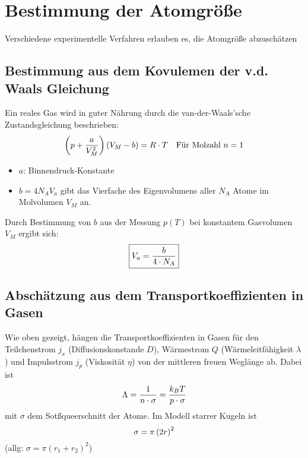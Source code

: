 \section{Bestimmung der Atomgröße} %
\label{sec:Bestimmung_der_Atomgroesse}
Verschiedene experimentelle Verfahren erlauben es, die Atomgröße abzuschätzen

\subsection{Bestimmung aus dem Kovulemen der v.d. Waals Gleichung} %
\label{sub:Bestimmung_aus_dem_Kovulemen_der_v.d._Waals_Gleichung}
Ein reales Gas wird in guter Nährung durch die van-der-Waals'sche
Zustandsgleichung beschrieben:
\begin{equation*}
    \left( p + \frac{a}{V_M^2}\right) \left( V_M -b \right) = R \cdot T \quad \text{Für Molzahl
    $n=1$}
\end{equation*}
\begin{itemize}
    \item $a$: Binnendruck-Konstante
    \item $b=4 N_A V_a$ gibt das Vierfache des Eigenvolumens aller $N_A$ Atome
    im Molvolumen $V_M$ an.
\end{itemize}
Durch Bestimmung von $b$ aus der Messung $p(T)$ bei konstantem Gasvolumen $V_M$
ergibt sich:
\begin{equation*}
    \boxed{
        V_a = \frac{b}{4 \cdot N_A}
        }
\end{equation*}

\subsection{Abschätzung aus dem Transportkoeffizienten in Gasen} %
\label{sub:Abschätzung_aus_dem_Transportkoeffizienten_in_Gasen}
Wie oben gezeigt, hängen die Transportkoeffizienten in Gasen für den
Teilchenstrom $j_x$ (Diffusionskonstande $D$), Wärmestrom $Q$
(Wärmeleitfähigkeit $\lambda$) und Impulsstrom $j_p$ (Viskosität $\eta$) von
der mittleren freuen Weglänge ab.
Dabei ist
\begin{equation*}
    \Lambda = \frac{1}{n \cdot \sigma}=\frac{k_B T}{p \cdot \sigma}
\end{equation*}
mit $\sigma$ dem Sotßqueerschnitt der Atome. Im Modell starrer Kugeln ist
\begin{equation*}
    \sigma = \pi \left( 2r \right)^2
\end{equation*}
(allg: $\sigma = \pi (r_1 + r_2)^2$)

